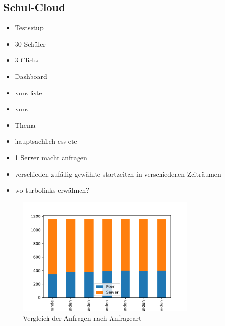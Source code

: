 



\subsection{Schul-Cloud}

\begin{itemize}
	\item Testsetup
	\item 30 Schüler
	\item 3 Clicks
	\item Dashboard
	\item kurs liste
	\item kurs
	\item Thema
	\item hauptsächlich css etc
	\item 1 Server macht anfragen
	\item verschieden zufällig gewählte startzeiten in verschiedenen Zeiträumen
	\item wo turbolinks erwähnen?
\end{itemize}
\begin{figure}[!h]
	\centering
	\includegraphics[width=0.8\textwidth]{figures/sc_stacked_interval}
	\caption[A Figure Short-Title]{Vergleich der Anfragen nach Anfrageart}
	\label{fig:15_clients_network}
\end{figure}

